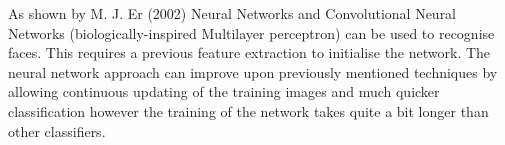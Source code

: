 As shown by M. J. Er (2002)
\cite{RBF_NN}\cite{CNN}Neural Networks and Convolutional Neural Networks (biologically-inspired Multilayer perceptron) can be used to recognise faces. This requires a previous feature extraction to initialise the network. The neural network approach can improve upon previously mentioned techniques by allowing continuous updating of the training images and much quicker classification however the training of the network takes quite a bit longer than other classifiers.


	



